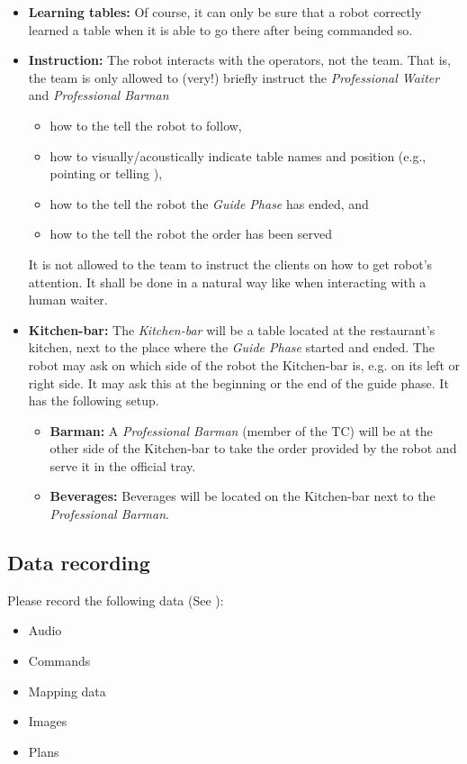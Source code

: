 \begin{itemize}
	\item \textbf{Learning tables:} Of course, it can only be sure that a robot correctly learned a table when it is able to go there after being commanded so. 
	
	\item \textbf{Instruction:} The robot interacts with the operators, not the team. That is, the team is only allowed to (very!) briefly instruct the \textit{Professional Waiter} and \textit{Professional Barman} 
	\begin{itemize}
		\item how to the tell the robot to follow,
		\item how to visually/acoustically indicate table names and position (e.g., pointing or telling ), 
		\item how to the tell the robot the \textit{Guide Phase} has ended, and
		\item how to the tell the robot the order has been served
	\end{itemize}
	It is not allowed to the team to instruct the clients on how to get robot's attention. It shall be done in a natural way like when interacting with a human waiter.

	\item \textbf{Kitchen-bar:} The \textit{Kitchen-bar} will be a table located at the restaurant's kitchen, next to the place where the \textit{Guide Phase} started and ended. 
	The robot may ask on which side of the robot the Kitchen-bar is, e.g. on its left or right side. It may ask this at the beginning or the end of the guide phase.
	It has the following setup.
	\begin{itemize}
		\item \textbf{Barman:} A \textit{Professional Barman} (member of the TC) will be at the other side of the Kitchen-bar to take the order provided by the robot and serve it in the official tray.
		\item \textbf{Beverages:} Beverages will be located on the Kitchen-bar next to the \textit{Professional Barman}.
	\end{itemize}

\end{itemize}

\subsection{Data recording}
  Please record the following data (See ):
  \begin{itemize}
   \item Audio
   \item Commands
   \item Mapping data
   \item Images
   \item Plans
  \end{itemize}

